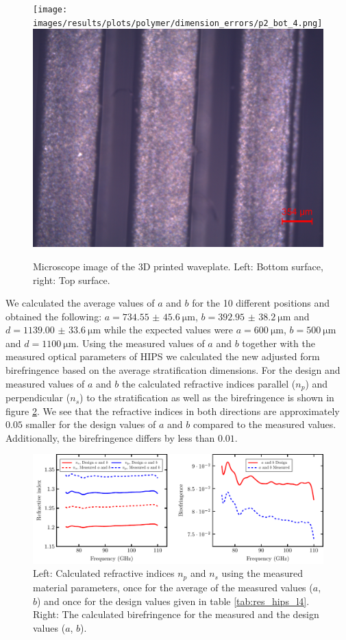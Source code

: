\begin{figure}[H]
\centering
    \subcaptionbox{\label{fig:p2bot4}}
        {\hspace*{-2em}\texttt{[image: images/results/plots/polymer/dimension\_errors/p2\_bot\_4.png]}}
    \qquad
    \subcaptionbox{\label{fig:p2top2}}
        {\hspace*{-2em}\includegraphics[width=0.47\linewidth]{images/results/plots/polymer/dimension_errors/p2_top_2.png}}
    \caption{Microscope image of the 3D printed waveplate. Left: Bottom surface, right: Top surface.}
\label{fig:hips_wp_photos}
\end{figure}

We calculated the average values of $a$ and $b$ for the 10 different positions and obtained the following: $a=\SI[separate-uncertainty = true]{734.55(4560)}{\micro \meter}$, $b=\SI[separate-uncertainty = true]{392.95(3820)}{\micro \meter}$ and $d=\SI[separate-uncertainty = true]{1139.00(3360)}{\micro \meter}$ while the expected values were $a=\SI{600}{\micro \meter}$, $b=\SI{500}{\micro \meter}$ and $d=\SI{1100}{\micro \meter}$. Using the measured values of $a$ and $b$ together with the measured optical parameters of HIPS we calculated the new adjusted form birefringence based on the average stratification dimensions. For the design and measured values of $a$ and $b$ the calculated refractive indices parallel ($n_p$) and perpendicular ($n_s$) to the stratification as well as the birefringence is shown in figure \ref{fig:ri_stripe_err}. We see that the refractive indices in both directions are approximately $0.05$ smaller for the design values of $a$ and $b$ compared to the measured values. Additionally, the birefringence differs by less than $0.01$.

\begin{figure}[H]
    \centering
    \includegraphics[scale=.65]{images/results/plots/polymer/dimension_errors/ri_stripe_error.pdf}
    \caption{Left: Calculated refractive indices $n_p$ and $n_s$ using the measured material parameters, once for the average of the measured values ($a$, $b$) and once for the design values given in table \ref{tab:res_hips_l4}. Right: The calculated birefringence for the measured and the design values ($a$, $b$).}
    \label{fig:ri_stripe_err}
\end{figure}

